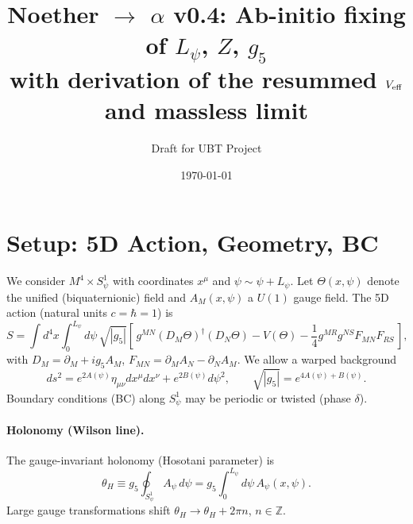 \documentclass[12pt]{article}
\title{Noether $\to$ $\alpha$ v0.4: Ab-initio fixing of $L_\psi$, $Z$, $g_5$ \\ \large with derivation of the resummed $V_{\rm eff}$ and massless limit}
\author{Draft for UBT Project}
\date{\today}
\begin{document}
\maketitle

\section{Setup: 5D Action, Geometry, BC}
We consider $M^4 \times S^1_\psi$ with coordinates $x^\mu$ and $\psi \sim \psi+L_\psi$.
Let $\Theta(x,\psi)$ denote the unified (biquaternionic) field and $A_M(x,\psi)$ a $U(1)$ gauge field.
The 5D action (natural units $c=\hbar=1$) is
\begin{equation}
S = \int d^4x \int_0^{L_\psi} d\psi\, \sqrt{|g_5|}\left[
\, g^{MN} (D_M\Theta)^\dagger (D_N\Theta)
 - V(\Theta) - \frac{1}{4} g^{MR} g^{NS} F_{MN}F_{RS}\,\right],
\label{eq:5Daction}
\end{equation}
with $D_M=\partial_M + i g_5 A_M$, $F_{MN}=\partial_M A_N-\partial_N A_M$.
We allow a warped background
\begin{equation}
ds^2 = e^{2A(\psi)} \eta_{\mu\nu}dx^\mu dx^\nu + e^{2B(\psi)} d\psi^2,
\qquad \sqrt{|g_5|}=e^{4A(\psi)+B(\psi)}.
\end{equation}
Boundary conditions (BC) along $S^1_\psi$ may be periodic or twisted (phase $\delta$).

\paragraph{Holonomy (Wilson line).}
The gauge-invariant holonomy (Hosotani parameter) is
\begin{equation}
\theta_H \equiv g_5 \oint_{S^1_\psi} \! A_\psi \, d\psi = g_5 \int_0^{L_\psi} d\psi\, A_\psi(x,\psi).
\label{eq:thetaH}
\end{equation}
Large gauge transformations shift $\theta_H \to \theta_H + 2\pi n$, $n\in\mathbb{Z}$.
\end{document}
